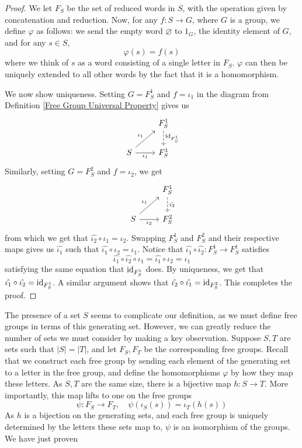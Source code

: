 \begin{proof}
    We let $F_S$ be the set of reduced words in $S$, with the operation given by concatenation and reduction. Now, for any $f: S \to G$, where $G$ is a group, we define $\varphi$ as follows: we send the empty word $\varnothing$ to $1_G$, the identity element of $G$, and for any $s \in S$, 
    \[\varphi(s) = f(s)\]
    where we think of $s$ as a word consisting of a single letter in $F_S$. $\varphi$ can then be uniquely extended to all other words by the fact that it is a homomorphism. 

    We now show uniqueness. Setting $G = F_S^1$ and $f = \iota_1$ in the diagram from Definition \ref{Free Group Universal Property} gives us 
    \[\begin{tikzcd}
        & {F_S^1} \\
        S & {F_S^1}
        \arrow["\id_{F_S^1}", dashed, from=1-2, to=2-2]
        \arrow["\iota_1",from=2-1, to=1-2]
        \arrow["\iota_1"', from=2-1, to=2-2]
    \end{tikzcd}\]
    Similarly, setting $G = F_S^2$ and $f = \iota_2$, we get 
    \[\begin{tikzcd}
        & {F_S^1} \\
        S & {F_S^2}
        \arrow["\hat{\iota_2}", dashed, from=1-2, to=2-2]
        \arrow["\iota_1",from=2-1, to=1-2]
        \arrow["\iota_2"', from=2-1, to=2-2]
    \end{tikzcd}\]
    from which we get that $\hat{\iota_2} \circ \iota_1 = \iota_2$. Swapping $F_S^1$ and $F_S^2$  and their respective maps gives us $\hat{\iota_1}$ such that $\hat{\iota_1} \circ \iota_2 = \iota_1$.
    Notice that $\hat{\iota_1} \circ \hat{\iota_2}: F_S^1 \to F_S^1$ satisfies 
    \[ \hat{\iota_1} \circ \hat{\iota_2} \circ \iota_1 = \hat{\iota_1} \circ \iota_2 = \iota_1 \]
    satisfying the same equation that $\operatorname{id}_{F_S^1}$ does. By uniqueness, we get that $\hat{\iota_1} \circ \hat{\iota_2} = \operatorname{id}_{F_S^1}$. A similar argument shows that $\hat{\iota_2} \circ \hat{\iota_1} = \operatorname{id}_{F_S^2}$. This completes the proof. 
\end{proof}

The presence of a set $S$ seems to complicate our definition, as we must define free groups in terms of this generating set. However, we can greatly reduce the number of sets we must consider by making a key observation. Suppose $S,T$ are sets such that $|S| = |T|$, and let $F_S, F_T$ be the corresponding free groups. Recall that we construct each free group by sending each element of the generating set to a letter in the free group, and define the homomorphisms $\varphi$ by how they map these letters. As $S,T$ are the same size, there is a bijective map $h: S \to T$. More importantly, this map lifts to one on the free groups 
\[ \psi: F_S \to F_T, \quad \psi(\iota_S(s)) = \iota_T(h(s)) \]
As $h$ is a bijection on the generating sets, and each free group is uniquely determined by the letters these sets map to, $\psi$ is an isomorphism of the groups. We have just proven 

